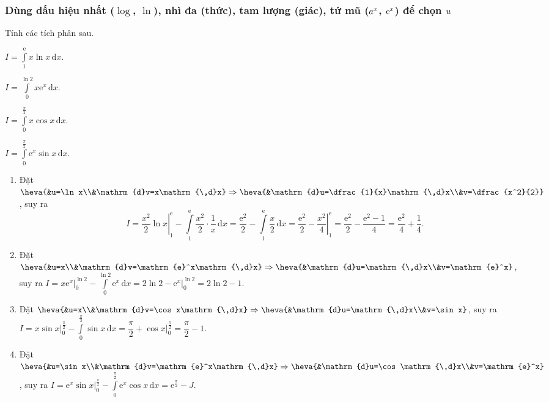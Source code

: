 \subsubsection{Dùng dấu hiệu nhất ($\log$, $\ln $), nhì đa (thức), tam lượng (giác), tứ mũ ($\lowercase{a^x}$, $\lowercase{\mathrm{e}^x}$) để chọn $\lowercase{u}$}
\begin{ex}%
	Tính các tích phân sau.
	\begin{listEX}[4]
		\item $\displaystyle I=\int\limits_{1}^{\mathrm{e}}x\ln x\mathrm{\,d}x$.
		\item $\displaystyle I=\int\limits_{0}^{\ln 2}x\mathrm{e}^x\mathrm{\,d}x$.
		\item $\displaystyle I=\int\limits_{0}^{\frac{\pi}{2}}x\cos x\mathrm{\,d}x$.
		\item $\displaystyle I=\int\limits_{0}^{\frac{\pi}{2}}\mathrm{e}^x\sin x\mathrm{\,d}x$.
	\end{listEX}
	\loigiai
	{
	\begin{enumerate}
		\item Đặt $\heva{&u=\ln x\\&\mathrm{d}v=x\mathrm{\,d}x}\Rightarrow\heva{&\mathrm{d}u=\dfrac{1}{x}\mathrm{\,d}x\\&v=\dfrac{x^2}{2}}$, suy ra
		\[I=\left.\dfrac{x^2}{2}\ln x\right|_{1}^{\mathrm{e}}-\int\limits_1^{\mathrm{e}}\dfrac{x^2}{2}\cdot\dfrac{1}{x}\mathrm{\,d}x=\dfrac{\mathrm{e}^2}{2}-\int\limits_1^{\mathrm{e}}\dfrac{x}{2}\mathrm{\,d}x=\dfrac{\mathrm{e}^2}{2}-\left.\dfrac{x^2}{4}\right|_{1}^{\mathrm{e}}=\dfrac{\mathrm{e}^2}{2}-\dfrac{\mathrm{e}^2-1}{4}=\dfrac{\mathrm{e}^2}{4}+\dfrac{1}{4}.\]
		\item Đặt $\heva{&u=x\\&\mathrm{d}v=\mathrm{e}^x\mathrm{\,d}x}\Rightarrow\heva{&\mathrm{d}u=\mathrm{\,d}x\\&v=\mathrm{e}^x}$, suy ra
		$\displaystyle I=\left.x\mathrm{e}^x\right|_{0}^{\ln 2}-\int\limits_{0}^{\ln 2}\mathrm{e}^x\mathrm{\,d}x=2\ln 2-\left.\mathrm{e}^x\right|_0^{\ln 2}=2\ln 2-1$.
		\item Đặt $\heva{&u=x\\&\mathrm{d}v=\cos x\mathrm{\,d}x}\Rightarrow\heva{&\mathrm{d}u=\mathrm{\,d}x\\&v=\sin x}$, suy ra $\displaystyle I=\left.x\sin x\right|_{0}^{\frac{\pi}{2}}-\int\limits_{0}^{\frac{\pi}{2}}\sin x\mathrm{\,d}x=\dfrac{\pi}{2}+\left.\cos x\right|_{0}^{\frac{\pi}{2}}=\dfrac{\pi}{2}-1$.
		\item Đặt $\heva{&u=\sin x\\&\mathrm{d}v=\mathrm{e}^x\mathrm{\,d}x}\Rightarrow\heva{&\mathrm{d}u=\cos\mathrm{\,d}x\\&v=\mathrm{e}^x}$, suy ra $\displaystyle I=\left.\mathrm{e}^x\sin x\right|_{0}^{\frac{\pi}{2}}-\int\limits_0^{\frac{\pi}{2}}\mathrm{e}^x\cos x\mathrm{\,d}x=\mathrm{e}^{\frac{\pi}{2}}-J$.\\

\end{enumerate}}
\end{ex}

